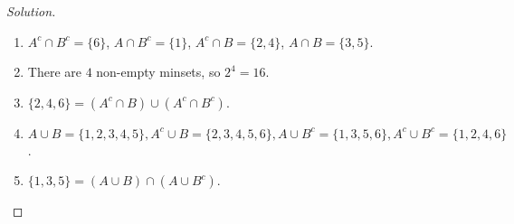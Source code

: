 \documentclass[crop=false,class=book,oneside]{standalone}
\begin{document}
    \begin{proof}[Solution]
    \vspace{-\topsep}
    \
    \begin{enumerate}
        \item $A^c\cap B^c = \{6\}$, $A\cap B^c = \{1\}$, $A^c \cap B = \{2,4\}$, $A\cap B = \{3,5\}$.
        \item There are $4$ non-empty minsets, so $2^4 = 16$. 
        \item $\{2,4,6\} = (A^c \cap B)\cup (A^c \cap B^c)$.
        \item $A\cup B = \{1,2,3,4,5\}, A^c \cup B = \{2,3,4,5,6\}, A\cup B^c = \{1,3,5,6\}, A^c \cup B^c = \{1,2,4,6\}$.
        \item $\{1,3,5\} = (A\cup B) \cap (A\cup B^c)$.
    \end{enumerate}
    \end{proof}
\end{document}
